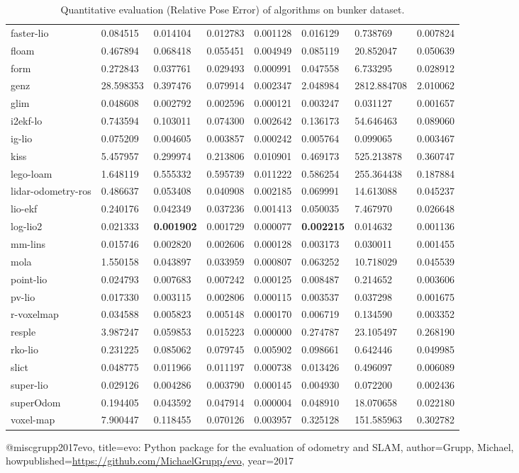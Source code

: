 \begin{table}[]
{\begin{tabular}{llllllll}
		faster-lio & 0.084515 & 0.014104 & 0.012783 & 0.001128 & 0.016129 & 0.738769 & 0.007824 \\
		floam & 0.467894 & 0.068418 & 0.055451 & 0.004949 & 0.085119 & 20.852047 & 0.050639 \\
		form & 0.272843 & 0.037761 & 0.029493 & 0.000991 & 0.047558 & 6.733295 & 0.028912 \\
		genz & 28.598353 & 0.397476 & 0.079914 & 0.002347 & 2.048984 & 2812.884708 & 2.010062 \\
		glim & 0.048608 & 0.002792 & 0.002596 & 0.000121 & 0.003247 & 0.031127 & 0.001657 \\
		i2ekf-lo & 0.743594 & 0.103011 & 0.074300 & 0.002642 & 0.136173 & 54.646463 & 0.089060 \\
		ig-lio & 0.075209 & 0.004605 & 0.003857 & 0.000242 & 0.005764 & 0.099065 & 0.003467 \\
		kiss & 5.457957 & 0.299974 & 0.213806 & 0.010901 & 0.469173 & 525.213878 & 0.360747 \\
		lego-loam & 1.648119 & 0.555332 & 0.595739 & 0.011222 & 0.586254 & 255.364438 & 0.187884 \\
		lidar-odometry-ros & 0.486637 & 0.053408 & 0.040908 & 0.002185 & 0.069991 & 14.613088 & 0.045237 \\
		lio-ekf & 0.240176 & 0.042349 & 0.037236 & 0.001413 & 0.050035 & 7.467970 & 0.026648 \\
		log-lio2 & 0.021333 & \textbf{0.001902} & 0.001729 & 0.000077 & \textbf{0.002215} & 0.014632 & 0.001136 \\
		mm-lins & 0.015746 & 0.002820 & 0.002606 & 0.000128 & 0.003173 & 0.030011 & 0.001455 \\
		mola & 1.550158 & 0.043897 & 0.033959 & 0.000807 & 0.063252 & 10.718029 & 0.045539 \\
		point-lio & 0.024793 & 0.007683 & 0.007242 & 0.000125 & 0.008487 & 0.214652 & 0.003606 \\
		pv-lio & 0.017330 & 0.003115 & 0.002806 & 0.000115 & 0.003537 & 0.037298 & 0.001675 \\
		r-voxelmap & 0.034588 & 0.005823 & 0.005148 & 0.000170 & 0.006719 & 0.134590 & 0.003352 \\
		resple & 3.987247 & 0.059853 & 0.015223 & 0.000000 & 0.274787 & 23.105497 & 0.268190 \\
		rko-lio & 0.231225 & 0.085062 & 0.079745 & 0.005902 & 0.098661 & 0.642446 & 0.049985 \\
		slict & 0.048775 & 0.011966 & 0.011197 & 0.000738 & 0.013426 & 0.496097 & 0.006089 \\
		super-lio & 0.029126 & 0.004286 & 0.003790 & 0.000145 & 0.004930 & 0.072200 & 0.002436 \\
		superOdom & 0.194405 & 0.043592 & 0.047914 & 0.000004 & 0.048910 & 18.070658 & 0.022180 \\
		voxel-map & 7.900447 & 0.118455 & 0.070126 & 0.003957 & 0.325128 & 151.585963 & 0.302782 \\
        	\end{tabular}%
        }
        	\caption{Quantitative evaluation (Relative Pose Error\cite{grupp2017evo}) of algorithms on bunker dataset.}
        	\label{table3}
\end{table}

@misc{grupp2017evo,
  title={evo: Python package for the evaluation of odometry and SLAM},
  author={Grupp, Michael},
  howpublished={\url{https://github.com/MichaelGrupp/evo}},
  year={2017}
}
